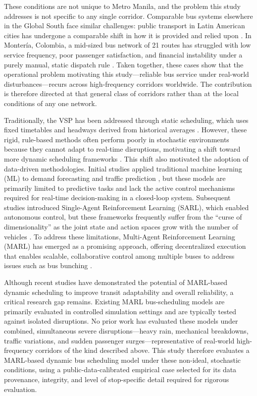 These conditions are not unique to Metro Manila, and the problem this study addresses is not specific to any single corridor. Comparable bus systems elsewhere in the Global South face similar challenges: public transport in Latin American cities has undergone a comparable shift in how it is provided and relied upon \cite{Tironi2018}. In Monter\'ia, Colombia, a mid-sized bus network of 21 routes has struggled with low service frequency, poor passenger satisfaction, and financial instability under a purely manual, static dispatch rule \cite{Barrera2025Optimization}. Taken together, these cases show that the operational problem motivating this study---reliable bus service under real-world disturbances---recurs across high-frequency corridors worldwide. The contribution is therefore directed at that general class of corridors rather than at the local conditions of any one network.

Traditionally, the VSP has been addressed through static scheduling, which uses fixed timetables and headways derived from historical averages \cite{Ceder2007}. However, these rigid, rule-based methods often perform poorly in stochastic environments because they cannot adapt to real-time disruptions, motivating a shift toward more dynamic scheduling frameworks \cite{Ollero2024EDSA}. This shift also motivated the adoption of data-driven methodologies. Initial studies applied traditional machine learning (ML) to demand forecasting and traffic prediction \cite{Wang2017}, but these models are primarily limited to predictive tasks and lack the active control mechanisms required for real-time decision-making in a closed-loop system. Subsequent studies introduced Single-Agent Reinforcement Learning (SARL), which enabled autonomous control, but these frameworks frequently suffer from the ``curse of dimensionality'' as the joint state and action spaces grow with the number of vehicles \cite{Chen2024Survey}. To address these limitations, Multi-Agent Reinforcement Learning (MARL) has emerged as a promising approach, offering decentralized execution that enables scalable, collaborative control among multiple buses to address issues such as bus bunching \cite{Wang2020Holding}.

Although recent studies have demonstrated the potential of MARL-based dynamic scheduling to improve transit adaptability and overall reliability, a critical research gap remains. Existing MARL bus-scheduling models are primarily evaluated in controlled simulation settings and are typically tested against isolated disruptions. No prior work has evaluated these models under combined, simultaneous severe disruptions---heavy rain, mechanical breakdowns, traffic variations, and sudden passenger surges---representative of real-world high-frequency corridors of the kind described above. This study therefore evaluates a MARL-based dynamic bus scheduling model under these non-ideal, stochastic conditions, using a public-data-calibrated empirical case selected for its data provenance, integrity, and level of stop-specific detail required for rigorous evaluation.

